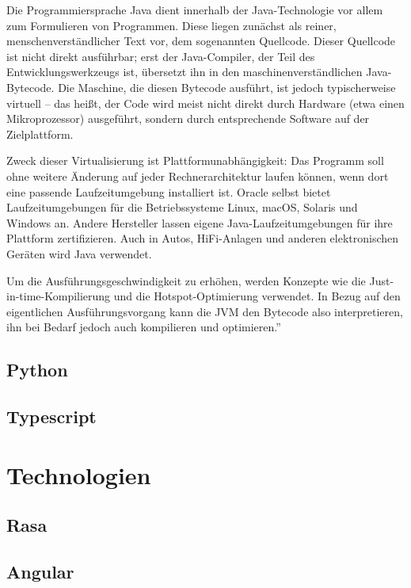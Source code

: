 Die Programmiersprache Java dient innerhalb der Java-Technologie vor allem zum Formulieren von Programmen. Diese liegen zunächst als reiner, menschenverständlicher Text vor, dem sogenannten Quellcode. Dieser Quellcode ist nicht direkt ausführbar; erst der Java-Compiler, der Teil des Entwicklungswerkzeugs ist, übersetzt ihn in den maschinenverständlichen Java-Bytecode. Die Maschine, die diesen Bytecode ausführt, ist jedoch typischerweise virtuell – das heißt, der Code wird meist nicht direkt durch Hardware (etwa einen Mikroprozessor) ausgeführt, sondern durch entsprechende Software auf der Zielplattform.

Zweck dieser Virtualisierung ist Plattformunabhängigkeit: Das Programm soll ohne weitere Änderung auf jeder Rechnerarchitektur laufen können, wenn dort eine passende Laufzeitumgebung installiert ist. Oracle selbst bietet Laufzeitumgebungen für die Betriebssysteme Linux, macOS, Solaris und Windows an. Andere Hersteller lassen eigene Java-Laufzeitumgebungen für ihre Plattform zertifizieren. Auch in Autos, HiFi-Anlagen und anderen elektronischen Geräten wird Java verwendet.

Um die Ausführungsgeschwindigkeit zu erhöhen, werden Konzepte wie die Just-in-time-Kompilierung und die Hotspot-Optimierung verwendet. In Bezug auf den eigentlichen Ausführungsvorgang kann die JVM den Bytecode also interpretieren, ihn bei Bedarf jedoch auch kompilieren und optimieren.”\cite{java}

\subsection{Python}

\subsection{Typescript}

\section{Technologien}

\subsection{Rasa}

\subsection{Angular}


